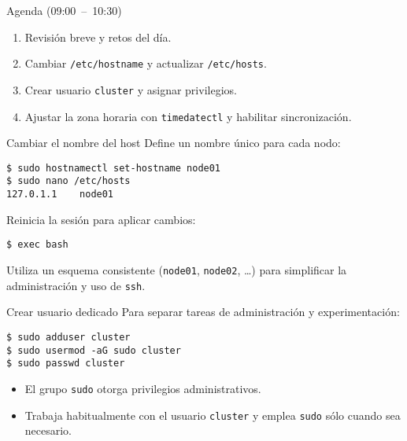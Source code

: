 \documentclass[aspectratio=169,professionalfonts]{beamer}
\begin{document}
\begin{frame}[fragile]{Agenda (09:00 – 10:30)}
  \begin{enumerate}
    \item Revisión breve y retos del día.
    \item Cambiar \texttt{/etc/hostname} y actualizar \texttt{/etc/hosts}.
    \item Crear usuario \texttt{cluster} y asignar privilegios.
    \item Ajustar la zona horaria con \texttt{timedatectl} y habilitar sincronización.
  \end{enumerate}
\end{frame}

\begin{frame}[fragile]{Cambiar el nombre del host}
  Define un nombre único para cada nodo:
  \begin{verbatim}
$ sudo hostnamectl set-hostname node01
$ sudo nano /etc/hosts
127.0.1.1    node01
  \end{verbatim}
  Reinicia la sesión para aplicar cambios:
  \begin{verbatim}
$ exec bash
  \end{verbatim}
  \begin{infobox}
  Utiliza un esquema consistente (\texttt{node01}, \texttt{node02}, …) para simplificar la administración y uso de \texttt{ssh}.
  \end{infobox}
\end{frame}

\begin{frame}[fragile]{Crear usuario dedicado}
  Para separar tareas de administración y experimentación:
  \begin{verbatim}
$ sudo adduser cluster
$ sudo usermod -aG sudo cluster
$ sudo passwd cluster
  \end{verbatim}
  \begin{itemize}
    \item El grupo \texttt{sudo} otorga privilegios administrativos.
    \item Trabaja habitualmente con el usuario \texttt{cluster} y emplea \texttt{sudo} sólo cuando sea necesario.
  \end{itemize}
\end{frame}
\end{document}
